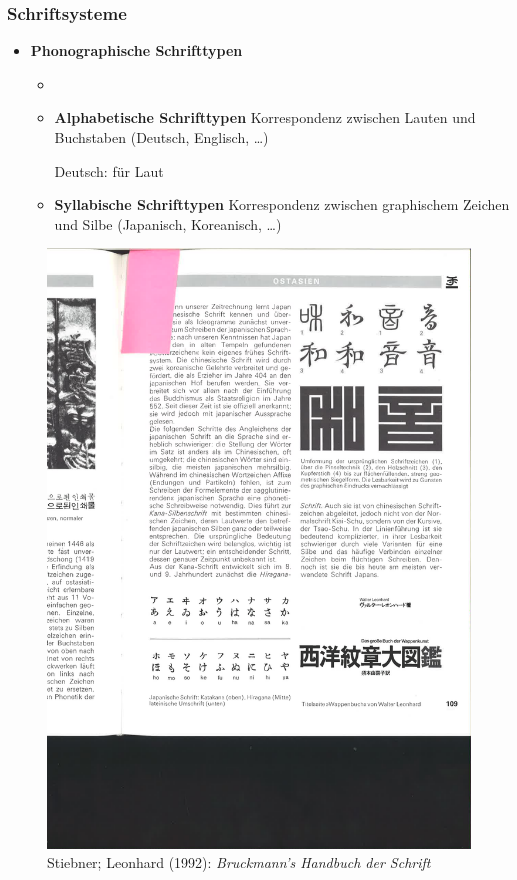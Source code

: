 \begin{frame}
\frametitle{Schriftsysteme}

\begin{itemize}
	\item \textbf{Phonographische Schrifttypen}
	
	\begin{itemize}
		\item[]
		\item \textbf{Alphabetische Schrifttypen} \ras Korrespondenz zwischen Lauten und Buchstaben (Deutsch, Englisch, \dots)
		
		Deutsch:  für Laut \textipa{[k]}
		
		\item \textbf{Syllabische Schrifttypen} \ras Korrespondenz zwischen graphischem Zeichen und Silbe (Japanisch, Koreanisch, \dots)
		
		
	\end{itemize}
\end{itemize}

\begin{figure}
\centering

\includegraphics[scale=.55]{material/04JapaneseSyll.pdf}
\caption{Stiebner; Leonhard (1992): \textit{Bruckmann's Handbuch der Schrift}}
\end{figure}

\end{frame}
